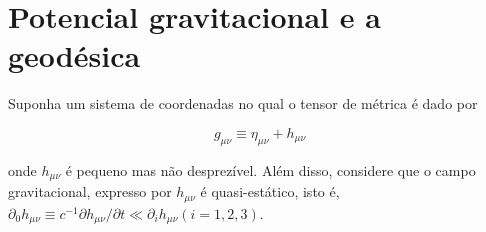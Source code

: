 




\section{Potencial gravitacional e a geodésica}\label{sec:PotencialGravitacionalGeodesica}

Suponha um sistema de coordenadas no qual o tensor de métrica é dado por

\begin{equation}\label{eq:TensorMetricaLocal}
g_{\mu \nu} \equiv \eta_{\mu \nu}+h_{\mu \nu}
\end{equation}

onde $ h_{\mu \nu} $ é pequeno mas não desprezível. Além disso, considere que o campo gravitacional, expresso por $ h_{\mu\nu} $ é quasi-estático, isto é, $ \partial_{0} h_{\mu \nu} \equiv c^{-1} \partial h_{\mu \nu} / \partial t \ll \partial_{i} h_{\mu \nu} (i=1,2,3) $.

